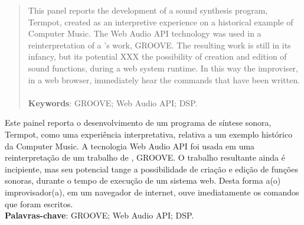 \documentclass[12pt]{article}
\begin{document}
 

\maketitle


\begin{abstract}
This panel reports the development of a sound synthesis program, Termpot, created as an interpretive experience on a historical example of Computer Music. The Web Audio API technology was used in a reinterpretation of a \cite{mathews_groove_1970}'s work, GROOVE. The resulting work is still in its infancy, but its potential XXX the possibility of creation and edition of sound functions, during a web system runtime. In this way the improviser, in a web browser, immediately hear the commands that have been written.
\ \\
\textbf{Keywords}: GROOVE; Web Audio API; DSP.
\end{abstract}


\begin{resumo} 
Este painel reporta o desenvolvimento de um programa de síntese sonora, Termpot, como uma experiência interpretativa, relativa a um exemplo histórico da Computer Music. A tecnologia Web Audio API foi usada em uma reinterpretação de um trabalho de \cite{mathews_groove_1970}, GROOVE. O trabalho resultante ainda é incipiente, mas seu potencial tange a possibilidade de criação e edição de funções sonoras, durante o tempo de execução de um sistema web. Desta forma a(o) improvisador(a), em um navegador de internet, ouve imediatamente os comandos que foram escritos. 
\ \\
\textbf{Palavras-chave}: GROOVE; Web Audio API; DSP.
\end{resumo}



%

%

 


\end{document}
